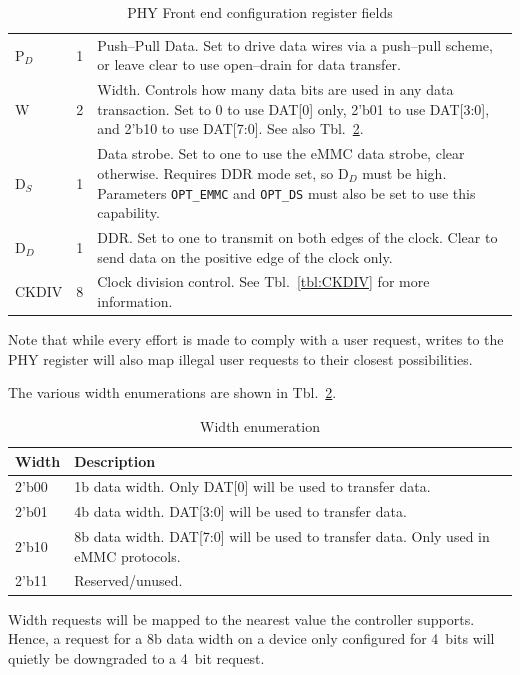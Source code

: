 \documentclass{gqtekspec}
\begin{document}
\begin{table}
\begin{center}
\begin{tabular}{|p{1.2in}|p{0.5in}|p{4.0in}|}
	\\
P$_D$ & 1 & Push--Pull Data.  Set to drive data wires via a push--pull
	scheme, or leave clear to use open--drain for data transfer.
	\\
%
%
W & 2 & Width.  Controls how many data bits are used in any data transaction.
	Set to 0 to use DAT[0] only, 2'b01 to use DAT[3:0], and 2'b10 to use
	DAT[7:0].  See also Tbl.~\ref{tbl:PHY-WIDTH}. \\
D$_S$&1& Data strobe.  Set to one to use the eMMC data strobe, clear
	otherwise.  Requires DDR mode set, so D$_D$ must be high.  Parameters
	{\tt OPT\_EMMC} and {\tt OPT\_DS} must also be set to use this
	capability.\\
D$_D$ & 1 & DDR.  Set to one to transmit on both edges of the clock.  Clear
	to send data on the positive edge of the clock only. \\
CKDIV & 8 & Clock division control.  See Tbl.~\ref{tbl:CKDIV} for more
	information.
	\\\hline
\end{tabular}
\caption{PHY Front end configuration register fields}\label{tbl:PHY}
\end{center}\end{table}
Note that while every effort is made to comply with a user request, writes to
the PHY register will also map illegal user requests to their closest
possibilities.

The various width enumerations are shown in Tbl.~\ref{tbl:PHY-WIDTH}.
\begin{table}\begin{center}
\begin{tabular}{|p{1.2in}|p{4.0in}|}\hline
	\rowcolor[gray]{0.85} Width & Description\\\hline\hline
2'b00 & 1b data width.  Only DAT[0] will be used to transfer data.\\
2'b01 & 4b data width.  DAT[3:0] will be used to transfer data.\\
2'b10 & 8b data width.  DAT[7:0] will be used to transfer data.  Only used in
	eMMC protocols.\\
2'b11 & Reserved/unused.  \\\hline
\end{tabular}
\caption{Width enumeration}\label{tbl:PHY-WIDTH}
\end{center}\end{table}
Width requests will be mapped to the nearest value the controller supports.
Hence, a request for a 8b data width on a device only configured for 4~bits
will quietly be downgraded to a 4~bit request.
\end{document}
